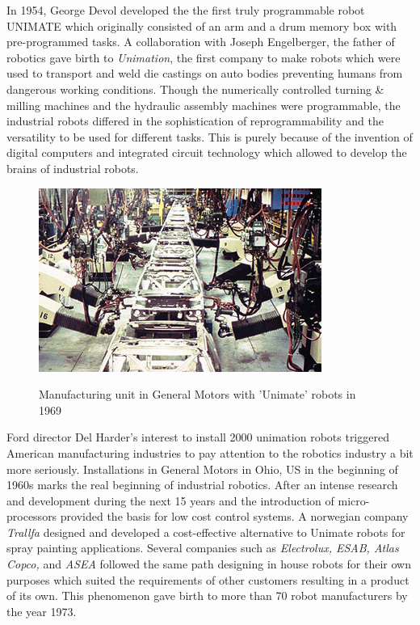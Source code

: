 In 1954, George Devol developed the the first truly programmable robot UNIMATE which originally consisted of an arm and a drum memory box with pre-programmed tasks. A collaboration with Joseph Engelberger, the father of robotics gave birth to \textit{Unimation}, the first company to make robots which were used to transport and weld die castings on auto bodies preventing humans from dangerous working conditions. Though the numerically controlled turning \& milling machines and the hydraulic assembly machines were programmable, the industrial robots differed in the sophistication of reprogrammability and the versatility to be used for different tasks. This is purely because of the invention of digital computers and integrated circuit technology which allowed to develop the brains of industrial robots.

\begin{figure}[h]
\centering
{\includegraphics[scale=1]{chapters/intro/images/gm.jpg}}
\caption{Manufacturing unit in General Motors with 'Unimate' robots in 1969}
\label{fig:unimate}
\end{figure}

Ford director Del Harder's interest to install 2000 unimation robots triggered American manufacturing industries to pay attention to the robotics industry a bit more seriously. Installations in General Motors in Ohio, US in the beginning of 1960s marks the real beginning of industrial robotics. After an intense research and development during the next 15 years and the introduction of micro-processors provided the basis for low cost control systems. A norwegian company \textit{Trallfa} designed and developed a cost-effective alternative to Unimate robots for spray painting applications. Several companies such as \textit{Electrolux, ESAB, Atlas Copco,} and \textit{ASEA} followed the same path designing in house robots for their own purposes which suited the requirements of other customers resulting in a product of its own. This phenomenon gave birth to more than 70 robot manufacturers by the year 1973.



